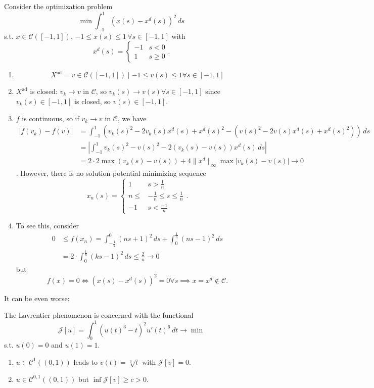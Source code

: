 \begin{eg}
    Consider the optimization problem \[
        \min \int_{-1}^1 (x(s)-x^d(s))^2 \, ds
    \] s.t. $x \in \mathcal{C}([-1,1])$, $-1 \leq x(s) \leq 1 \, \forall s \in [-1,1]$ with \[
    x^d(s) = \begin{cases} -1 &s<0\\ 1 &s \geq 0 \end{cases}
    .\] 
    \begin{enumerate}
        \item \[
            X^\text{ad} = {v \in \mathcal{C}([-1,1]) \mid -1 \leq v(s) \leq 1 \forall s \in [-1,1] }\]
            \item $X^\text{ad}$ is closed: $v_k \to v$ in $\mathcal{C}$, so $v_k(s) \to v(s) \forall s \in [-1,1]$ since $v_k(s) \in [-1,1]$ is closed, so $v(s) \in [-1,1]$.
            \item $f$ is continuous, so if $v_k \to v$ in $\mathcal{C}$, we have
        \begin{align*}
            |f(v_k) - f(v)| &= \int_{-1}^1 (v_k(s)^2 - 2v_k(s)x^d(s)+x^d(s)^2 - (v(s)^2-2v(s)x^d(s)+x^d(s)^2)) \, ds \\
                            &= \left| \int_{-1}^1 v_k(s)^2 - v(s)^2 - 2(v_k(s)-v(s))x^d(s) \, ds \right| \\
                            &= 2 \cdot 2 \max(v_k(s)-v(s)) + 4\|x^d\|_\infty \max |v_k(s)-v(s)| \to 0
        \end{align*}
        . However, there is no solution potential minimizing sequence \[
            x_n(s) = \begin{cases} 1 &s > \frac{1}{n}\\ n \leq &-\frac{1}{n} \leq s \leq \frac{1}{n} \\ -1 &s<\frac{-1}{n} \end{cases}
        .\] 
    \item To see this, consider
        \begin{align*}
            0 &\leq f(x_n) = \int_{- \frac{1}{k}}^0 (ns +1)^2 \, ds + \int_0^{\frac{1}{n}} (ns-1)^2 \,ds \\
              &=2 \cdot \int_0^{\frac{1}{n}} (ks-1)^2 \, ds \leq \frac{2}{n} \to 0
        \end{align*}
        but \[
        f(x) = 0 \iff (x(s)-x^d(s))^2=0 \forall s \implies x=x^d \notin \mathcal{C}
        .\] 
    \end{enumerate}
\end{eg}
It can be even worse:
\begin{eg}
    The Lavrentier phenomenon is concerned with the functional 
    \[
        \mathcal{J}[u]=\int_0^1 (u(t)^3-t)^2 u'(t)^6 \, dt \to \min
    \] s.t. $u(0)=0$ and $u(1)=1$.
    \begin{enumerate}
        \item $u \in \mathcal{C}^1((0,1))$ leads to $v(t)=\sqrt[3]{t}$ with $\mathcal{J}[v]=0$.
        \item $u \in \mathcal{C}^{0,1}((0,1))$ but $\inf \mathcal{J}[v] \geq c >0$.
    \end{enumerate}
\end{eg}
